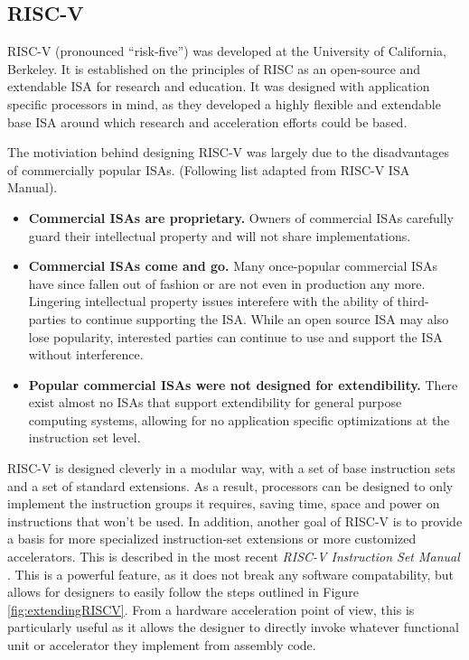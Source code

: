\subsection{RISC-V}

    \glsdesc{RISC-V} (pronounced ``risk-five'') was developed at the University of California, Berkeley. It is established on the principles of RISC as an open-source and extendable \gls{ISA} for research and education. It was designed with application specific processors in mind, as they developed a highly flexible and extendable base \gls{ISA} around which research and acceleration efforts could be based.

    The motiviation behind designing RISC-V was largely due to the disadvantages of commercially popular \glspl{ISA}.\cite{Isa2012} (Following list adapted from RISC-V ISA Manual).
    \begin{itemize}
    \item \textbf{Commercial ISAs are proprietary.} Owners of commercial ISAs carefully guard their intellectual property and will not share implementations. 
    \item \textbf{Commercial ISAs come and go.} Many once-popular commercial ISAs have since fallen out of fashion or are not even in production any more. Lingering intellectual property issues interefere with the ability of third-parties to continue supporting the ISA. While an open source \gls{ISA} may also lose popularity, interested parties can continue to use and support the ISA without interference.
    \item \textbf{Popular commercial ISAs were not designed for extendibility.} There exist almost no ISAs that support extendibility for general purpose computing systems, allowing for no application specific optimizations at the instruction set level.
    \end{itemize}

    RISC-V is designed cleverly in a modular way, with a set of base instruction sets and a set of standard extensions. As a result, processors can be designed to only implement the instruction groups it requires, saving time, space and power on instructions that won't be used. In addition, another goal of RISC-V is to provide a basis for more specialized instruction-set extensions or more customized accelerators. This is described in the most recent \textit{RISC-V Instruction Set Manual} \cite{Waterman2019}. This is a powerful feature, as it does not break any software compatability, but allows for designers to easily follow the steps outlined in Figure \ref{fig:extendingRISCV}. From a \gls{hardware acceleration} point of view, this is particularly useful as it allows the designer to directly invoke whatever functional unit or accelerator they implement from assembly code.
    
